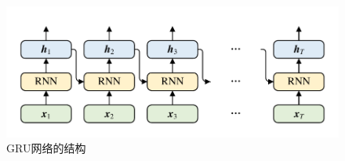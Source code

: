 \begin{figure}[htb]
	\centering
	\includegraphics[page=5, width=0.85\linewidth]{images/structure.pdf}
	\caption{GRU网络的结构}
	\label{fig:GRU}
\end{figure}